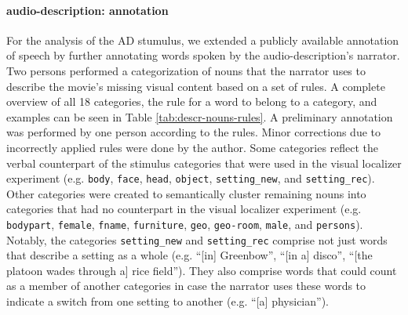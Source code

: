\documentclass[english]{article}
\begin{document}
\paragraph{audio-description: annotation}

For the analysis of the AD stumulus, we extended a publicly available annotation
of speech \citep{haeusler2020speechanno} by further annotating words spoken by
the audio-description's narrator.
Two persons performed a categorization of nouns that the narrator uses to
describe the movie's missing visual content based on a set of rules.
A complete overview of all 18 categories, the rule for a word to belong to a
category, and examples can be seen in Table \ref{tab:descr-nouns-rules}.
A preliminary annotation was performed by one person according to the rules.
Minor corrections due to incorrectly applied rules were done by the author.
Some categories reflect the verbal counterpart of the stimulus categories that
were used in the visual localizer experiment (e.g. \texttt{body}, \texttt{face},
\texttt{head}, \texttt{object}, \texttt{setting\_new}, and
\texttt{setting\_rec}).
Other categories were created to semantically cluster remaining nouns into
categories that had no counterpart in the visual localizer experiment (e.g.
\texttt{bodypart}, \texttt{female}, \texttt{fname}, \texttt{furniture},
\texttt{geo}, \texttt{geo-room}, \texttt{male}, and \texttt{persons}).
Notably, the categories \texttt{setting\_new} and \texttt{setting\_rec} comprise
not just words that describe a setting as a whole (e.g. ``[in] Greenbow'', ``[in
a] disco'', ``[the platoon wades through a] rice field''). They also comprise
words that could count as a member of another categories in case the narrator
uses these words to indicate a switch from one setting to another (e.g. ``[a]
physician'').
\end{document}
